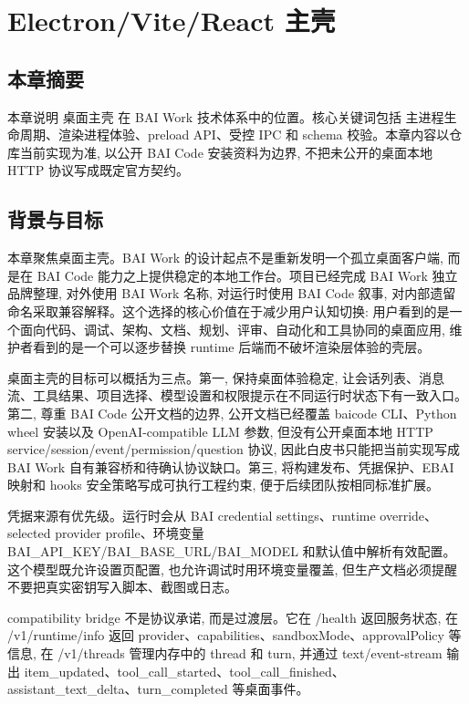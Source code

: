 \chapter{Electron/Vite/React 主壳}
\section{本章摘要}
本章说明 桌面主壳 在 BAI Work 技术体系中的位置。核心关键词包括 主进程生命周期、渲染进程体验、preload API、受控 IPC 和 schema 校验。本章内容以仓库当前实现为准, 以公开 BAI Code 安装资料为边界, 不把未公开的桌面本地 HTTP 协议写成既定官方契约。

\section{背景与目标}
本章聚焦桌面主壳。BAI Work 的设计起点不是重新发明一个孤立桌面客户端, 而是在 BAI Code 能力之上提供稳定的本地工作台。项目已经完成 BAI Work 独立品牌整理, 对外使用 BAI Work 名称, 对运行时使用 BAI Code 叙事, 对内部遗留命名采取兼容解释。这个选择的核心价值在于减少用户认知切换: 用户看到的是一个面向代码、调试、架构、文档、规划、评审、自动化和工具协同的桌面应用, 维护者看到的是一个可以逐步替换 runtime 后端而不破坏渲染层体验的壳层。

桌面主壳的目标可以概括为三点。第一, 保持桌面体验稳定, 让会话列表、消息流、工具结果、项目选择、模型设置和权限提示在不同运行时状态下有一致入口。第二, 尊重 BAI Code 公开文档的边界, 公开文档已经覆盖 baicode CLI、Python wheel 安装以及 OpenAI-compatible LLM 参数, 但没有公开桌面本地 HTTP service/session/event/permission/question 协议, 因此白皮书只能把当前实现写成 BAI Work 自有兼容桥和待确认协议缺口。第三, 将构建发布、凭据保护、EBAI 映射和 hooks 安全策略写成可执行工程约束, 便于后续团队按相同标准扩展。

凭据来源有优先级。运行时会从 BAI credential settings、runtime override、selected provider profile、环境变量 BAI\_API\_KEY/BAI\_BASE\_URL/BAI\_MODEL 和默认值中解析有效配置。这个模型既允许设置页配置, 也允许调试时用环境变量覆盖, 但生产文档必须提醒不要把真实密钥写入脚本、截图或日志。

compatibility bridge 不是协议承诺, 而是过渡层。它在 /health 返回服务状态, 在 /v1/runtime/info 返回 provider、capabilities、sandboxMode、approvalPolicy 等信息, 在 /v1/threads 管理内存中的 thread 和 turn, 并通过 text/event-stream 输出 item\_updated、tool\_call\_started、tool\_call\_finished、assistant\_text\_delta、turn\_completed 等桌面事件。

